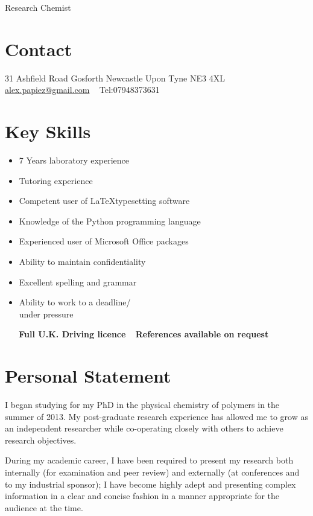 \documentclass[]{friggeri-cv}
\begin{document}
       {Research Chemist}
       {}


\begin{aside}
  \section{Contact}
    31 Ashfield Road
    Gosforth
    Newcastle Upon Tyne
    NE3 4XL
    ~
    \href{mailto:alex.papiez@gmail.com}{alex.papiez@gmail.com}
    ~
    Tel:07948373631
    ~
  \section{Key Skills}
   \begin{itemize}
   \item 7 Years laboratory experience
   \item Tutoring experience
   \item Competent user of \LaTeX typesetting software
   \item Knowledge of the Python programming language
   \item Experienced user of Microsoft Office packages
   \item Ability to maintain confidentiality
   \item Excellent spelling and grammar
   \item Ability to work to a deadline/ \\ under pressure
   \end{itemize}
   ~
   ~
   \textbf{Full U.K. Driving licence}
   ~
   \textbf{References available on request}
\end{aside}

\section{Personal Statement}

I began studying for my PhD in the physical chemistry of polymers in the summer of 2013. My post-graduate research experience has allowed me to grow as an independent researcher while co-operating closely with others to achieve research objectives. 

During my academic career, I have been required to present my research both internally (for examination and peer review) and externally (at conferences and to my industrial sponsor); I have become highly adept and presenting complex information in a clear and concise fashion in a manner appropriate for the audience at the time. 
\end{document}
